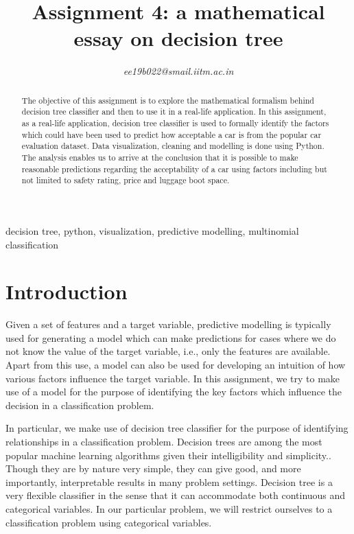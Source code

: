 \documentclass[conference]{IEEEtran}
\begin{document}
\title{Assignment 4: a mathematical essay on decision tree\\}


\author{
\textit{ee19b022@smail.iitm.ac.in}

}

\maketitle

\begin{abstract}
The objective of this assignment is to explore the mathematical formalism behind decision tree classifier and then to use it in a real-life application. In this assignment, as a real-life application, decision tree classifier is used to formally identify the factors which could have been used to predict how acceptable a car is from the popular car evaluation dataset. Data visualization, cleaning and modelling is done using Python. The analysis enables us to arrive at the conclusion that it is possible to make reasonable predictions regarding the acceptability of a car using factors including but not limited to safety rating, price and luggage boot space. 
\end{abstract}

\begin{IEEEkeywords}
decision tree, python, visualization, predictive modelling, multinomial classification
\end{IEEEkeywords}

\section{Introduction}

Given a set of features and a target variable, predictive modelling is typically used for generating a model which can make predictions for cases where we do not know the value of the target variable, i.e., only the features are available. Apart from this use, a model can also be used for developing an intuition of how various factors influence the target variable. In this assignment, we try to make use of a model for the purpose of identifying the key factors which influence the decision in a classification problem.

In particular, we make use of decision tree classifier for the purpose of identifying relationships in a classification problem. Decision trees are among the most popular machine learning algorithms given their intelligibility and simplicity.. Though they are by nature very simple, they can give good, and more importantly, interpretable results in many problem settings. Decision tree is a very flexible classifier in the sense that it can accommodate both continuous and categorical variables. In our particular problem, we will restrict ourselves to a classification problem using categorical variables.
\end{document}

